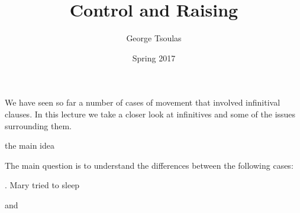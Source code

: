 



\title{Control and Raising}
\date{Spring 2017}
\author{George Tsoulas}


\maketitle



\begin{frame}

  We have seen so far a number of cases of movement that involved infinitival clauses.  In this lecture we take a closer look at infinitives and some of the issues surrounding them.

\end{frame}
{the main idea}

The main question is to understand the differences between the following cases:

\ex.
Mary tried to sleep

and 

